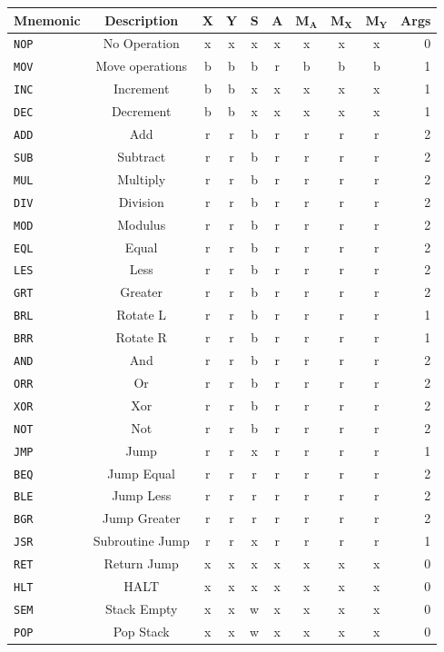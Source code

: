 \documentclass{article}
\newcommand{\x}{$\textbf{X}$}
\newcommand{\y}{$\textbf{Y}$}
\newcommand{\s}{$\textbf{S}$}
\newcommand{\A}{$\textbf{A}$}
\newcommand{\mx}{$\textbf{M}_{\textbf{X}}$}
\newcommand{\my}{$\textbf{M}_{\textbf{Y}}$}
\newcommand{\ma}{$\textbf{M}_{\textbf{A}}$}
\newcommand{\V}{\verb}
\begin{document}
\begin{tabular}{l || c | *{7}{c|} | r}     
\textbf{Mnemonic} & \textbf{Description} & \x & \y& \s & \A &\ma & \mx & \my &
Args
\\
\hline
\V+NOP+ & No Operation & x & x & x & x & x & x & x & 0  \\ 
\hline
\V+MOV+ & Move operations & b & b & b & r & b & b & b & 1 \\
\hline
\V+INC+ & Increment& b & b & x & x & x & x & x & 1 \\
\V+DEC+ & Decrement	& b & b & x & x & x & x & x & 1 \\
\V+ADD+ & Add		& r & r & b & r & r & r & r & 2 \\
\V+SUB+ & Subtract	& r & r & b & r & r & r & r & 2 \\
\V+MUL+ & Multiply	& r & r & b & r & r & r & r & 2 \\
\V+DIV+ & Division	& r & r & b & r & r & r & r & 2 \\
\V+MOD+ & Modulus	& r & r & b & r & r & r & r & 2 \\
\hline
\V+EQL+ & Equal		& r & r & b & r & r & r & r & 2 \\
\V+LES+ & Less		& r & r & b & r & r & r & r & 2 \\
\V+GRT+ & Greater 	& r & r & b & r & r & r & r & 2 \\
\V+BRL+ & Rotate L	& r & r & b & r & r & r & r & 1 \\
\V+BRR+ & Rotate R	& r & r & b & r & r & r & r & 1 \\
\V+AND+ & And		& r & r & b & r & r & r & r & 2 \\
\V+ORR+ & Or 		& r & r & b & r & r & r & r & 2 \\
\V+XOR+ & Xor		& r & r & b & r & r & r & r & 2 \\
\V+NOT+ & Not		& r & r & b & r & r & r & r & 2 \\
\hline
\V+JMP+ & Jump		& r & r & x & r & r & r & r & 1 \\ 
\V+BEQ+ & Jump Equal& r & r & r & r & r & r & r & 2 \\
\V+BLE+ & Jump Less	& r & r & r & r & r & r & r & 2 \\
\V+BGR+ & Jump Greater& r & r & r & r & r & r & r & 2 \\
\V+JSR+ & Subroutine Jump& r & r & x & r & r & r & r & 1 \\
\V+RET+ & Return Jump& x & x & x & x & x & x & x & 0 \\
\hline
\V+HLT+ & HALT& x & x & x & x & x & x & x & 0 \\
\V+SEM+ & Stack Empty& x & x & w & x & x & x & x & 0 \\
\V+POP+ & Pop Stack& x & x & w & x & x & x & x & 0 \\
\end{tabular}
 
\end{document}
